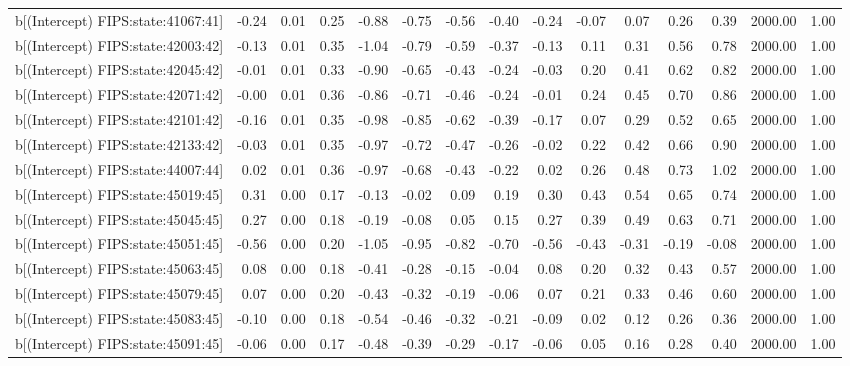 \begin{table}[ht]
\begin{tabular}{rrrrrrrrrrrrrrr}
  b[(Intercept) FIPS:state:41067:41] & -0.24 & 0.01 & 0.25 & -0.88 & -0.75 & -0.56 & -0.40 & -0.24 & -0.07 & 0.07 & 0.26 & 0.39 & 2000.00 & 1.00 \\ 
  b[(Intercept) FIPS:state:42003:42] & -0.13 & 0.01 & 0.35 & -1.04 & -0.79 & -0.59 & -0.37 & -0.13 & 0.11 & 0.31 & 0.56 & 0.78 & 2000.00 & 1.00 \\ 
  b[(Intercept) FIPS:state:42045:42] & -0.01 & 0.01 & 0.33 & -0.90 & -0.65 & -0.43 & -0.24 & -0.03 & 0.20 & 0.41 & 0.62 & 0.82 & 2000.00 & 1.00 \\ 
  b[(Intercept) FIPS:state:42071:42] & -0.00 & 0.01 & 0.36 & -0.86 & -0.71 & -0.46 & -0.24 & -0.01 & 0.24 & 0.45 & 0.70 & 0.86 & 2000.00 & 1.00 \\ 
  b[(Intercept) FIPS:state:42101:42] & -0.16 & 0.01 & 0.35 & -0.98 & -0.85 & -0.62 & -0.39 & -0.17 & 0.07 & 0.29 & 0.52 & 0.65 & 2000.00 & 1.00 \\ 
  b[(Intercept) FIPS:state:42133:42] & -0.03 & 0.01 & 0.35 & -0.97 & -0.72 & -0.47 & -0.26 & -0.02 & 0.22 & 0.42 & 0.66 & 0.90 & 2000.00 & 1.00 \\ 
  b[(Intercept) FIPS:state:44007:44] & 0.02 & 0.01 & 0.36 & -0.97 & -0.68 & -0.43 & -0.22 & 0.02 & 0.26 & 0.48 & 0.73 & 1.02 & 2000.00 & 1.00 \\ 
  b[(Intercept) FIPS:state:45019:45] & 0.31 & 0.00 & 0.17 & -0.13 & -0.02 & 0.09 & 0.19 & 0.30 & 0.43 & 0.54 & 0.65 & 0.74 & 2000.00 & 1.00 \\ 
  b[(Intercept) FIPS:state:45045:45] & 0.27 & 0.00 & 0.18 & -0.19 & -0.08 & 0.05 & 0.15 & 0.27 & 0.39 & 0.49 & 0.63 & 0.71 & 2000.00 & 1.00 \\ 
  b[(Intercept) FIPS:state:45051:45] & -0.56 & 0.00 & 0.20 & -1.05 & -0.95 & -0.82 & -0.70 & -0.56 & -0.43 & -0.31 & -0.19 & -0.08 & 2000.00 & 1.00 \\ 
  b[(Intercept) FIPS:state:45063:45] & 0.08 & 0.00 & 0.18 & -0.41 & -0.28 & -0.15 & -0.04 & 0.08 & 0.20 & 0.32 & 0.43 & 0.57 & 2000.00 & 1.00 \\ 
  b[(Intercept) FIPS:state:45079:45] & 0.07 & 0.00 & 0.20 & -0.43 & -0.32 & -0.19 & -0.06 & 0.07 & 0.21 & 0.33 & 0.46 & 0.60 & 2000.00 & 1.00 \\ 
  b[(Intercept) FIPS:state:45083:45] & -0.10 & 0.00 & 0.18 & -0.54 & -0.46 & -0.32 & -0.21 & -0.09 & 0.02 & 0.12 & 0.26 & 0.36 & 2000.00 & 1.00 \\ 
  b[(Intercept) FIPS:state:45091:45] & -0.06 & 0.00 & 0.17 & -0.48 & -0.39 & -0.29 & -0.17 & -0.06 & 0.05 & 0.16 & 0.28 & 0.40 & 2000.00 & 1.00 \\ 

\end{tabular}
\end{table}
